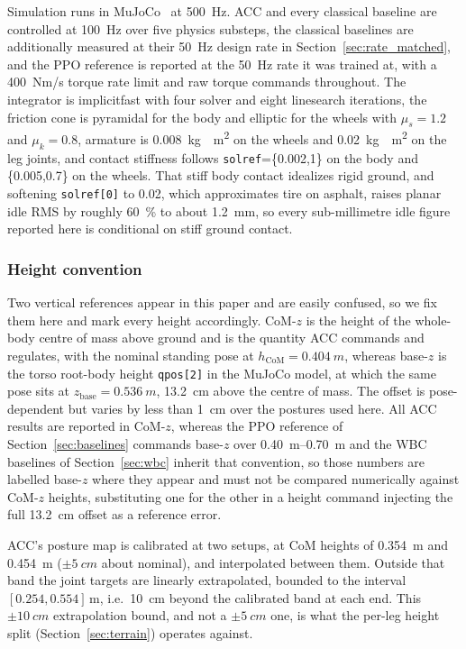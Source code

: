 \documentclass[a4paper,fleqn]{cas-dc}
\begin{document}
Simulation runs in MuJoCo~\cite{mujoco} at \SI{500}{Hz}. ACC and every classical
baseline are controlled at \SI{100}{Hz} over five physics substeps, the classical
baselines are additionally measured at their \SI{50}{Hz} design rate in
Section~\ref{sec:rate_matched}, and the PPO reference is reported at the
\SI{50}{Hz} rate it was trained at, with a \SI{400}{Nm/s} torque rate limit and
raw torque commands throughout. The integrator is implicitfast with four solver
and eight linesearch iterations, the friction cone is pyramidal for the body and
elliptic for the wheels with $\mu_s{=}1.2$ and $\mu_k{=}0.8$, armature is
\SI{0.008}{kg{\cdot}m^2} on the wheels and \SI{0.02}{kg{\cdot}m^2} on the leg
joints, and contact stiffness follows \texttt{solref}=\{0.002,1\} on the body and
\{0.005,0.7\} on the wheels. That stiff body contact idealizes rigid ground, and
softening \texttt{solref[0]} to \num{0.02}, which approximates tire on asphalt,
raises planar idle RMS by roughly \SI{60}{\percent} to about \SI{1.2}{mm}, so
every sub-millimetre idle figure reported here is conditional on stiff ground
contact.

\subsubsection*{Height convention}
\label{sec:height_convention}
Two vertical references appear in this paper and are easily confused, so we fix
them here and mark every height accordingly. CoM-$z$ is the height of the
whole-body centre of mass above ground and is the quantity ACC commands and
regulates, with the nominal standing pose at $h_{\text{CoM}}{=}\SI{0.404}{m}$,
whereas base-$z$ is the torso root-body height \texttt{qpos[2]} in the MuJoCo
model, at which the same pose sits at $z_{\text{base}}{=}\SI{0.536}{m}$,
\SI{13.2}{cm} above the centre of mass. The offset is pose-dependent but varies
by less than \SI{1}{cm} over the postures used here. All ACC results are reported
in CoM-$z$, whereas the PPO reference of Section~\ref{sec:baselines} commands
base-$z$ over \SIrange{0.40}{0.70}{m} and the WBC baselines of
Section~\ref{sec:wbc} inherit that convention, so those numbers are labelled
base-$z$ where they appear and must not be compared numerically against CoM-$z$
heights, substituting one for the other in a height command injecting the full
\SI{13.2}{cm} offset as a reference error.

ACC's posture map is calibrated at two setups, at CoM heights of \SI{0.354}{m}
and \SI{0.454}{m} ($\pm\SI{5}{cm}$ about nominal), and interpolated between
them. Outside that band the joint targets are linearly extrapolated, bounded to
the interval $[0.254, 0.554]\,$m, i.e.\ \SI{10}{cm} beyond the calibrated band at
each end. This $\pm\SI{10}{cm}$ extrapolation bound, and not a $\pm\SI{5}{cm}$
one, is what the per-leg height split (Section~\ref{sec:terrain}) operates against.
\end{document}
